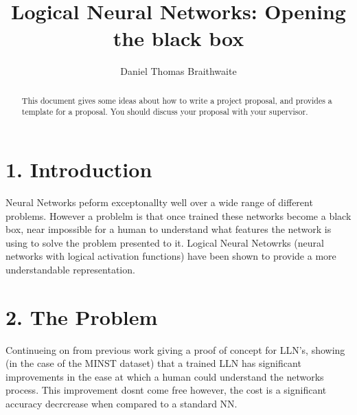 \documentclass[11pt, a4paper, twoside, openright]{report}
\title{Logical Neural Networks: Opening the black box}
\author{Daniel Thomas Braithwaite}
\date{}
\begin{document}
\frontmatter


\begin{abstract}
  This document gives some ideas about how to write a project
  proposal, and provides a template for a proposal. You should discuss
  your proposal with your supervisor.
\end{abstract}


\maketitle




\mainmatter


\section*{1. Introduction}

Neural Networks peform exceptonallty well over a wide range of different problems. However a problelm is that once trained these networks become a black box, near impossible for a human to understand what features the network is using to solve the problem presented to it. Logical Neural Netowrks (neural networks with logical activation functions) have been shown to provide a more understandable representation.

\section*{2. The Problem}

Continueing on from previous work giving a proof of concept for LLN's, showing (in the case of the MINST dataset) that a trained LLN has significant improvements in the ease at which a human could understand the networks process. This improvement dosnt come free however, the cost is a significant accuracy decrcrease when compared to a standard NN. \\
\end{document}
